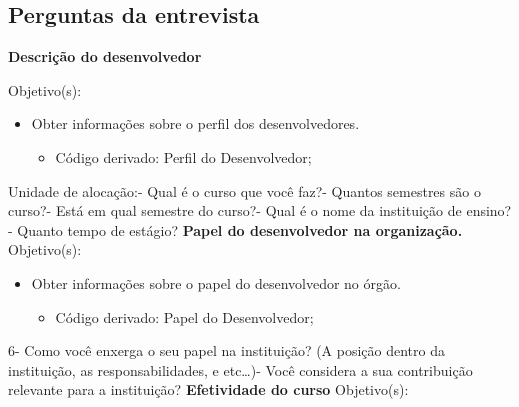 \begin{apendicesenv}

\partapendices

\chapter{Perguntas da entrevista}

\begin{flushleft}
	\textbf{Descrição do desenvolvedor}
\end{flushleft}
Objetivo(s):
\begin{itemize}
	\item Obter informações sobre o perfil dos desenvolvedores.
	\begin{itemize}
		\item Código derivado: Perfil do Desenvolvedor;
	\end{itemize}
\end{itemize}
Unidade de alocação:\newline{}- Qual é o curso que você faz?- Quantos semestres são o curso?- Está em qual semestre do curso?- Qual é o nome da instituição de ensino?- Quanto tempo de estágio?\newline
\newline
\textbf{Papel do desenvolvedor na organização.}\newline\newline
Objetivo(s):
\begin{itemize}
	\item Obter informações sobre o papel do desenvolvedor no órgão.
	\begin{itemize}
		\item Código derivado: Papel do Desenvolvedor;
	\end{itemize}
\end{itemize}
6- Como você enxerga o seu papel na instituição? (A posição dentro da instituição, as responsabilidades, e etc…)- Você considera a sua contribuição relevante para a instituição?\newline
\newline
\textbf{Efetividade do curso}\newline\newline
Objetivo(s):
\begin{itemize}

\end{itemize}
\end{apendicesenv}
